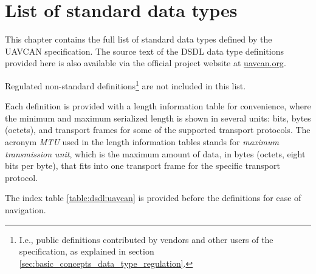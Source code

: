 \chapter{List of standard data types}

This chapter contains the full list of standard data types defined by the UAVCAN specification.
The source text of the DSDL data type definitions provided here is also available via the
official project website at \href{http://uavcan.org}{uavcan.org}.

Regulated non-standard definitions\footnote{I.e., public definitions contributed by vendors and other users
of the specification, as explained in section \ref{sec:basic_concepts_data_type_regulation}.}
are not included in this list.

Each definition is provided with a length information table for convenience,
where the minimum and maximum serialized length is shown in several units:
bits, bytes (octets), and transport frames for some of the supported transport protocols.
The acronym \emph{MTU} used in the length information tables stands for
\emph{maximum transmission unit}, which is the maximum amount of data, in bytes (octets, eight bits per byte),
that fits into one transport frame for the specific transport protocol.

The index table \ref{table:dsdl:uavcan} is provided before the definitions for ease of navigation.

\clearpage{}
